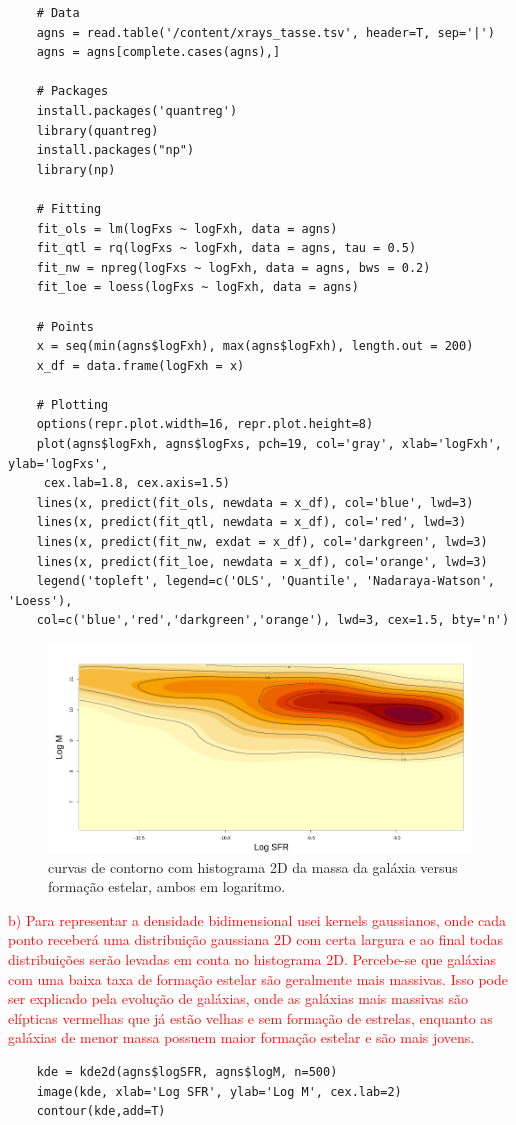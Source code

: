 \vspace{2em}

\begin{lstlisting}
    # Data
    agns = read.table('/content/xrays_tasse.tsv', header=T, sep='|')
    agns = agns[complete.cases(agns),]
    
    # Packages
    install.packages('quantreg')
    library(quantreg)
    install.packages("np")
    library(np)
    
    # Fitting
    fit_ols = lm(logFxs ~ logFxh, data = agns)
    fit_qtl = rq(logFxs ~ logFxh, data = agns, tau = 0.5)
    fit_nw = npreg(logFxs ~ logFxh, data = agns, bws = 0.2)
    fit_loe = loess(logFxs ~ logFxh, data = agns)
    
    # Points
    x = seq(min(agns$logFxh), max(agns$logFxh), length.out = 200)
    x_df = data.frame(logFxh = x)
    
    # Plotting
    options(repr.plot.width=16, repr.plot.height=8)
    plot(agns$logFxh, agns$logFxs, pch=19, col='gray', xlab='logFxh', ylab='logFxs',
     cex.lab=1.8, cex.axis=1.5)
    lines(x, predict(fit_ols, newdata = x_df), col='blue', lwd=3)
    lines(x, predict(fit_qtl, newdata = x_df), col='red', lwd=3)
    lines(x, predict(fit_nw, exdat = x_df), col='darkgreen', lwd=3)
    lines(x, predict(fit_loe, newdata = x_df), col='orange', lwd=3)
    legend('topleft', legend=c('OLS', 'Quantile', 'Nadaraya-Watson', 'Loess'), 
    col=c('blue','red','darkgreen','orange'), lwd=3, cex=1.5, bty='n')
\end{lstlisting}

\begin{figure}[h]
    \centering
    \includegraphics[width=0.8\linewidth]{Figuras/hist_2d.png}
    \caption{curvas de contorno com histograma 2D da massa da galáxia versus formação estelar, ambos em logaritmo.}
    \label{hist_2d}
\end{figure}


\textcolor{red}{b) Para representar a densidade bidimensional usei kernels gaussianos, onde cada ponto receberá uma distribuição gaussiana 2D com certa largura e ao final todas distribuições serão levadas em conta no histograma 2D. Percebe-se que galáxias com uma baixa taxa de formação estelar são geralmente mais massivas. Isso pode ser explicado pela evolução de galáxias, onde as galáxias mais massivas são elípticas vermelhas que já estão velhas e sem formação de estrelas, enquanto as galáxias de menor massa possuem maior formação estelar e são mais jovens. }

\begin{lstlisting}
    kde = kde2d(agns$logSFR, agns$logM, n=500)
    image(kde, xlab='Log SFR', ylab='Log M', cex.lab=2)
    contour(kde,add=T)
\end{lstlisting}

